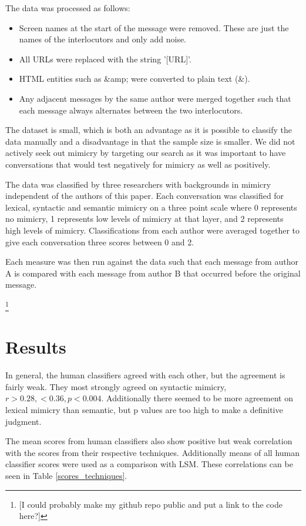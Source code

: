 \documentclass[conference]{IEEEtran}
\begin{document}
The data was processed as follows:
\begin{itemize}
	\item Screen names at the start of the message were removed. These are just the names of the 
		  interlocutors and only add noise.
	\item All URLs were replaced with the string '[URL]'.
	\item HTML entities such as \&amp; were converted to plain text (\&).
	\item Any adjacent messages by the same author were merged together such that each message always
	      alternates between the two interlocutors.
\end{itemize}

The dataset is small, which is both an advantage as it is possible to classify the data manually and a disadvantage in that the sample size is smaller. We did not actively seek out mimicry by targeting our search as it was important to have conversations that would test negatively for mimicry as well as positively.

The data was classified by three researchers with backgrounds in mimicry independent of the authors of  this paper. Each  conversation was classified for lexical, syntactic and semantic mimicry on a three point scale  where 0 represents no mimicry, 1 represents low levels of mimicry at that layer, and 2 represents high  levels of mimicry. Classifications from each author were averaged together to give each conversation three scores between 0 and 2.

Each measure was then run against the data such that each message from author A is compared with each  message from author B that occurred before the original message.

\footnote{[I could probably make my github repo public and put a link to the code here?]}


\section{Results}

In general, the human classifiers agreed with each other, but the agreement is fairly weak. They most strongly agreed on syntactic mimicry, \(r > 0.28, < 0.36, p < 0.004\). Additionally there seemed to be more agreement on lexical mimicry than semantic, but p values are too high to make a definitive judgment.

The mean scores from human classifiers also show positive but weak correlation with the scores from their respective techniques. Additionally means of all human classifier scores were used as a comparison with LSM. These correlations can be seen in Table \ref{scores_techniques}.
\end{document}
